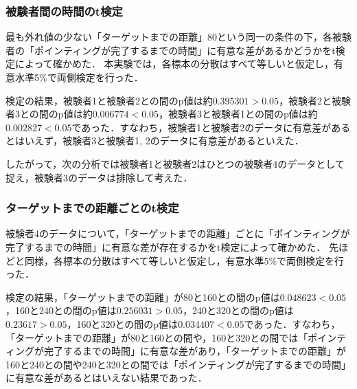 \documentclass[a4paper, papersize, titlepage]{jsarticle}
\begin{document}
\begin{multicols}{2}


\subsubsection{被験者間の時間のt検定}
最も外れ値の少ない「ターゲットまでの距離」80という同一の条件の下，各被験者の「ポインティングが完了するまでの時間」に有意な差があるかどうかをt検定によって確かめた．
本実験では，各標本の分散はすべて等しいと仮定し，有意水準5\%で両側検定を行った．

検定の結果，被験者1と被験者2との間のp値は約$0.395301 > 0.05$，被験者2と被験者3との間のp値は約$0.006774 < 0.05$，被験者3と被験者1との間のp値は約$0.002827 < 0.05$であった．すなわち，被験者1と被験者2のデータに有意差があるとはいえず，被験者3と被験者1, 2のデータに有意差があるといえた．

したがって，次の分析では被験者1と被験者2はひとつの被験者4のデータとして捉え，被験者3のデータは排除して考えた．

\subsubsection{ターゲットまでの距離ごとのt検定}
被験者4のデータについて，「ターゲットまでの距離」ごとに「ポインティングが完了するまでの時間」に有意な差が存在するかをt検定によって確かめた．
先ほどと同様，各標本の分散はすべて等しいと仮定し，有意水準5\%で両側検定を行った．

検定の結果，「ターゲットまでの距離」が80と160との間のp値は$0.048623 < 0.05$，160と240との間のp値は$0.256031 > 0.05$，240と320との間のp値は$0.23617 > 0.05$，160と320との間のp値は$0.034407 < 0.05$であった．すなわち，「ターゲットまでの距離」が80と160との間や，160と320との間では「ポインティングが完了するまでの時間」に有意な差があり，「ターゲットまでの距離」が160と240との間や240と320との間では「ポインティングが完了するまでの時間」に有意な差があるとはいえない結果であった．


\end{multicols}
\end{document}

